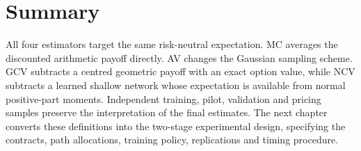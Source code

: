 \section{Summary}

All four estimators target the same risk-neutral expectation. MC averages the discounted arithmetic payoff directly. AV changes the Gaussian sampling scheme. GCV subtracts a centred geometric payoff with an exact option value, while NCV subtracts a learned shallow network whose expectation is available from normal positive-part moments. Independent training, pilot, validation and pricing samples preserve the interpretation of the final estimates. The next chapter converts these definitions into the two-stage experimental design, specifying the contracts, path allocations, training policy, replications and timing procedure.
